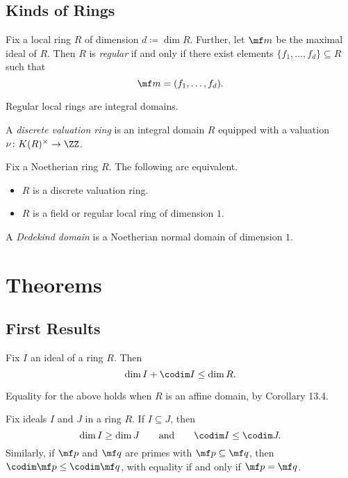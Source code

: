 \documentclass{article}
\begin{document}
\subsection{Kinds of Rings}
\begin{definition*}[Regular]
	Fix a local ring $R$ of dimension $d\coloneqq\dim R$. Further, let $\mf m$ be the maximal ideal of $R$. Then $R$ is \textit{regular} if and only if there exist elements $\{f_1,\ldots,f_d\}\subseteq R$ such that
	\[\mf m=(f_1,\ldots,f_d).\]
\end{definition*}
\begin{remark*}[Corollary 10.14]
	Regular local rings are integral domains.
\end{remark*}
\begin{definition*}
	A \textit{discrete valuation ring} is an integral domain $R$ equipped with a valuation $\nu\colon K(R)^\times\to\ZZ$.
\end{definition*}
\begin{proposition*}[Proposition 11.1] \label{prop:dvrgrabbag}
	Fix a Noetherian ring $R$. The following are equivalent.
	\begin{itemize}
		\item $R$ is a discrete valuation ring.
		\item $R$ is a field or regular local ring of dimension $1$.
	\end{itemize}
\end{proposition*}
\begin{definition*}[Dedekind]
	A \textit{Dedekind domain} is a Noetherian normal domain of dimension $1$.
\end{definition*}

\newpage
\section{Theorems}

\subsection{First Results}
\begin{proposition*} \label{prop:upperbounddimension}
	Fix $I$ an ideal of a ring $R$. Then
	\[\dim I+\codim I\le\dim R.\]
\end{proposition*}
\begin{remark*}
	Equality for the above holds when $R$ is an affine domain, by Corollary 13.4.
\end{remark*}
\begin{lemma*} \label{lem:diminclusionbounds}
	Fix ideals $I$ and $J$ in a ring $R$. If $I\subseteq J$, then
	\[\dim I\ge\dim J\qquad\text{and}\qquad\codim I\le\codim J.\]
	Similarly, if $\mf p$ and $\mf q$ are primes with $\mf p\subseteq\mf q$, then $\codim\mf p\le\codim\mf q$, with equality if and only if $\mf p=\mf q$.
\end{lemma*}
\end{document}

